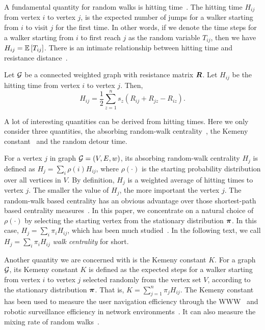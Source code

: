 \documentclass[journal]{IEEEtran}
\begin{document}
A fundamental quantity for random walks is hitting time~\cite{Lo93,CoBeTeVoKl07}. The hitting time \(H_{ij}\) from vertex \(i\) to vertex \(j\),  is the expected number of jumps for a walker starting  from \(i\) to visit \(j\) for the first time.
In other words, if we denote the time steps for a walker starting from \(i\) to first reach \(j\) as the random variable \(T_{ij}\), then we have \(H_{ij}=\mathbb{E}\left[T_{ij}\right]\).
There is an intimate relationship between hitting time and resistance distance~\cite{Te91}.
\begin{lemma}
    Let \(\mathcal{G}\) be a connected weighted graph with  resistance matrix  \(\boldsymbol{R}\). Let \(H_{ij}\) be the hitting time  from vertex \(i\) to vertex \(j\). Then,
    \begin{equation}\label{EE03}
        H_{ij}=\frac{1}{2}\sum_{z=1}^{n} s_z(R_{ij}+R_{jz}-R_{iz}).
    \end{equation}
\end{lemma}

A lot of interesting quantities can be derived from hitting times. Here we only consider three quantities, the absorbing random-walk centrality~\cite{MaMagi15}, the Kemeny constant~\cite{Hu14} and the random detour time.

For a vertex \(j\) in graph \(\mathcal{G}=(V,E,w)\), its absorbing random-walk centrality \(H_j\) is defined as \(H_j=\sum_{i} \rho(i) H_{ij}\), where \(\rho(\cdot)\) is the starting probability distribution over all vertices in \(V\). By definition, \(H_j\) is a weighted average of hitting times to vertex \(j\). The smaller the value of \(H_j\), the more important the vertex \(j\). The random-walk based centrality has an obvious advantage over those shortest-path based centrality measures~\cite{Ne05}. In this paper, we concentrate on a natural choice of  \(\rho(\cdot)\) by selecting the starting vertex from the stationary distribution \(\boldsymbol{\pi}\). In this case, \(H_j=\sum_{i} \pi_i H_{ij}\), which has been much studied~\cite{TeBeVo09,Be09,Be16}. In the following text, we  call \(H_j=\sum_{i} \pi_i H_{ij}\) \textit{walk centrality} for short.

Another quantity we are concerned with is the Kemeny constant \(K\). For a graph \(\mathcal{G}\), its Kemeny constant \(K\) is defined as the expected steps for a walker starting from  vertex \(i\) to vertex \(j\) selected randomly from the vertex set \(V\), according to the stationary distribution \(\boldsymbol{\pi}\). That is, \(K = \sum_{j = 1}^{n} \pi_j H_{ij}\). The Kemeny constant has been used to measure the user navigation efficiency through the WWW~\cite{LeLo02} and  robotic surveillance efficiency in network environments~\cite{PaAgBu15}. It can also measure the mixing rate of random walks~\cite{LePeWi09}.
\end{document}
